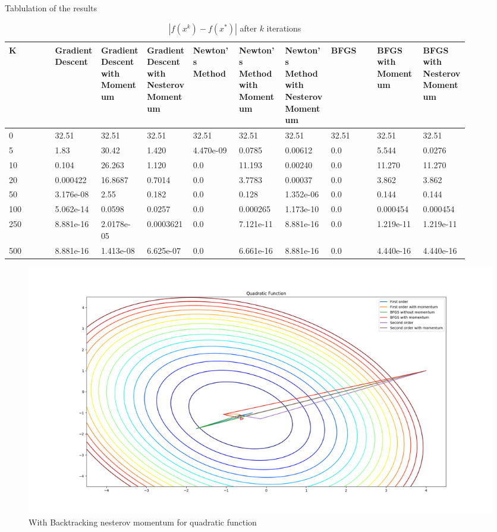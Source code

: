 \documentclass{article}
\begin{document}
Tablulation of the results

\begin{table}[H]
	\centering
	\caption{$ | f(x^k) - f(x^*) | $ after $k$ iterations}
	\label{Quadratic function table}
	\begin{tabular}{|l|p{0.1\linewidth}|p{0.1\linewidth}|p{0.1\linewidth}|p{0.1\linewidth}|p{0.1\linewidth}|p{0.1\linewidth}|p{0.1\linewidth}|p{0.1\linewidth}|p{0.1\linewidth}|}
		\hline
		K & Gradient Descent & Gradient Descent with Momentum & Gradient Descent with Nesterov Momentum & Newton's Method & Newton's Method with Momentum & Newton's Method with Nesterov Momentum & BFGS & BFGS with Momentum & BFGS with Nesterov Momentum \\
		\hline
		0 & 32.51 & 32.51 & 32.51 & 32.51 & 32.51 & 32.51 & 32.51 & 32.51 & 32.51 \\
		\hline
		5 & 1.83 & 30.42 & 1.420 & 4.470e-09 & 0.0785 & 0.00612 & 0.0 & 5.544 & 0.0276 \\
		\hline
		10 & 0.104 & 26.263 & 1.120 & 0.0 & 11.193 & 0.00240 & 0.0 & 11.270 & 11.270 \\
		\hline
		20 & 0.000422 & 16.8687 & 0.7014 & 0.0 & 3.7783 & 0.00037 & 0.0 & 3.862 & 3.862 \\
		\hline
		50 & 3.176e-08 & 2.55 & 0.182 & 0.0 & 0.128 & 1.352e-06 & 0.0 & 0.144 & 0.144 \\
		\hline
		100 & 5.062e-14 & 0.0598 & 0.0257 & 0.0 & 0.000265 & 1.173e-10 & 0.0 & 0.000454 & 0.000454 \\
		\hline
		250 & 8.881e-16 & 2.0178e-05 & 0.0003621 & 0.0 & 7.121e-11 & 8.881e-16 & 0.0 & 1.219e-11 & 1.219e-11 \\
		\hline
		500 & 8.881e-16 & 1.413e-08 & 6.625e-07 & 0.0 & 6.661e-16 & 8.881e-16 & 0.0 & 4.440e-16 & 4.440e-16 \\
		\hline
	\end{tabular}
\end{table}

\begin{figure}[H]
	\includegraphics[width=\linewidth]{../Images/quadraticnesterovbacktrack.png}
	\caption{With Backtracking nesterov momentum for quadratic function}
	\label{fig:With Backtracking nesterov momentum for quadratic function}
\end{figure}
\end{document}
